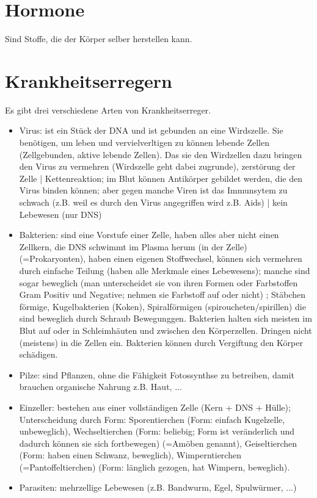 \documentclass[a4paper]{article}
\begin{document}
\section{Hormone}

Sind Stoffe, die der Körper selber herstellen kann.

\section{Krankheitserregern}

Es gibt drei verschiedene Arten von Krankheitserreger.

\begin{itemize}
\item Virus: ist ein Stück der DNA und ist gebunden an eine Wirdszelle. Sie benötigen, um leben und vervielverltigen zu können lebende Zellen (Zellgebunden, aktive lebende Zellen). Das sie den Wirdzellen dazu bringen den Virus zu vermehren (Wirdszelle geht dabei zugrunde), zerstörung der Zelle | Kettenreaktion; im Blut können Antikörper gebildet werden, die den Virus binden können; aber gegen manche Viren ist das Immunsytem zu schwach (z.B. weil es durch den Virus angegriffen wird z.B. Aids) | kein Lebewesen (nur DNS)

\item Bakterien:  sind eine Vorstufe einer Zelle, haben alles aber nicht einen Zellkern, die DNS schwimmt im Plasma herum (in der Zelle) (=Prokaryonten), haben einen eigenen Stoffwechsel, können sich vermehren durch einfache Teilung (haben alle Merkmale eines Lebewesens); manche sind sogar beweglich (man unterscheidet sie von ihren Formen oder Farbstoffen Gram Positiv und Negative; nehmen sie Farbstoff auf oder nicht) ; Stäbchen förmige, Kugelbakterien (Koken), Spiralförmigen (spiroucheten/spirillen) die sind beweglich durch Schraub Bewegunggen. Bakterien halten sich meisten im Blut auf oder in Schleimhäuten und zwischen den Körperzellen. Dringen nicht (meistens) in die Zellen ein. Bakterien können durch Vergiftung den Körper schädigen.

\item Pilze: sind Pflanzen, ohne die Fähigkeit Fotossynthse zu betreiben, damit brauchen organische Nahrung z.B. Haut, ...

\item Einzeller: bestehen aus einer vollständigen Zelle (Kern + DNS + Hülle); Unterscheidung durch Form: Sporentierchen (Form: einfach Kugelzelle, unbeweglich), Wechseltierchen (Form: beliebig; Form ist veränderlich und dadurch können sie sich fortbewegen) (=Amöben genannt), Geiseltierchen (Form: haben einen Schwanz, beweglich), Wimperntierchen (=Pantoffeltierchen) (Form: länglich gezogen, hat Wimpern, beweglich).

\item Parasiten: mehrzellige Lebewesen (z.B. Bandwurm, Egel, Spulwürmer, ...)
\end{itemize}
\end{document}
